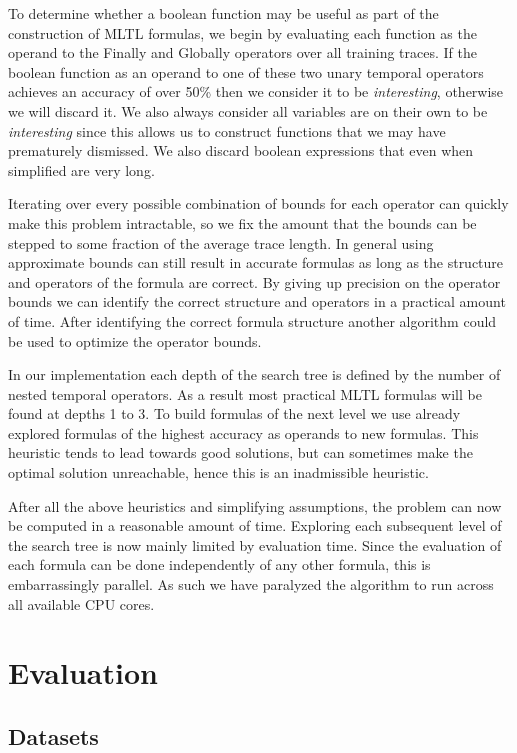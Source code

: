 \documentclass[12pt]{article}
\begin{document}
To determine whether a boolean function may be useful as part of the construction of MLTL formulas, we begin by evaluating each function as the operand to the Finally and Globally operators over all training traces. If the boolean function as an operand to one of these two unary temporal operators achieves an accuracy of over 50\% then we consider it to be \textit{interesting}, otherwise we will discard it. We also always consider all variables are on their own to be \textit{interesting} since this allows us to construct functions that we may have prematurely dismissed. We also discard boolean expressions that even when simplified are very long. 

Iterating over every possible combination of bounds for each operator can quickly make this problem intractable, so we fix the amount that the bounds can be stepped to some fraction of the average trace length. In general using approximate bounds can still result in accurate formulas as long as the structure and operators of the formula are correct. By giving up precision on the operator bounds we can identify the correct structure and operators in a practical amount of time. After identifying the correct formula structure another algorithm could be used to optimize the operator bounds.

In our implementation each depth of the search tree is defined by the number of nested temporal operators. As a result most practical MLTL formulas will be found at depths 1 to 3. To build formulas of the next level we use already explored formulas of the highest accuracy as operands to new formulas. This heuristic tends to lead towards good solutions, but can sometimes make the optimal solution unreachable, hence this is an inadmissible heuristic.

After all the above heuristics and simplifying assumptions, the problem can now be computed in a reasonable amount of time. Exploring each subsequent level of the search tree is now mainly limited by evaluation time. Since the evaluation of each formula can be done independently of any other formula, this is embarrassingly parallel. As such we have paralyzed the algorithm to run across all available CPU cores.


\section{Evaluation}

\subsection{Datasets}
\end{document}
